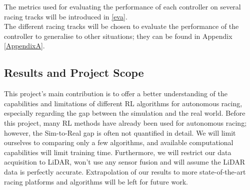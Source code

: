 The metrics used for evaluating the performance of each controller on several racing tracks will be introduced in \ref{eva}. \\

The different racing tracks will be chosen to evaluate the performance of the controller to generalise to other situations; they can be found in Appendix \ref{AppendixA}.


\subsection*{Results and Project Scope}
This project's main contribution is to offer a better understanding of the capabilities and limitations of different RL algorithms for autonomous racing, especially regarding the gap between the simulation and the real world. Before this project, many RL methods have already been used for autonomous racing; however, the Sim-to-Real gap is often not quantified in detail. We will limit ourselves to comparing only a few algorithms, and available computational capabilities will limit training time. Furthermore, we will restrict our data acquisition to LiDAR, won't use any sensor fusion and will assume the LiDAR data is perfectly accurate. \newline
Extrapolation of our results to more state-of-the-art racing platforms and algorithms will be left for future work.
\newpage